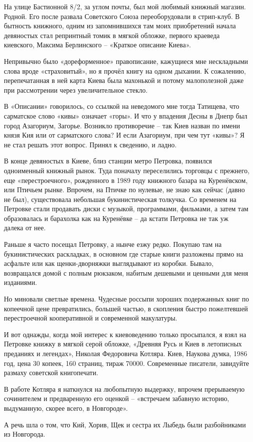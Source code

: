 На улице Бастионной 8/2, за углом почты, был мой любимый книжный магазин. Родной. Его после развала Советского Союза переоборудовали в стрип-клуб. В бытность книжного, одним из запомнившихся там моих приобретений начала девяностых стал репринтный томик в мягкой обложке, первого краеведа киевского, Максима Берлинского – «Краткое описание Киева».

Непривычно было «дореформенное» правописание, кажущиеся мне нескладными слова вроде «страховитый», но я прочёл книгу на одном дыхании. К сожалению, перепечатанная в ней карта Киева была махонькой и потому малополезной даже при рассмотрении через увеличительное стекло.

В «Описании» говорилось, со ссылкой на неведомого мне тогда Татищева, что сарматское слово «кивы» означает «горы». И что у впадения Десны в Днепр был город Азагориум, Загорье. Возникло противоречие – так Киев назван по имени князя Кия или от сарматского слова? И если Азагориум, при чем тут «кивы»? Я не стал решать этот вопрос. Принял к сведению, и ладно.

В конце девяностых в Киеве, близ станции метро Петровка, появился одноименный книжный рынок. Туда поначалу переселились торговцы с прежнего, еще «перестроечного», рожденного в 1989 году книжного базара на Куренёвском, или Птичьем рынке. Впрочем, на Птичке по нулевые, не знаю как сейчас (давно не был), существовала небольшая букинистическая толкучка. Со временем на Петровке стали продавать диски с музыкой, программами, фильмами, а затем там образовалась и барахолка как на Куренёвке – да кстати Петровка не так уж далека от нее.

Раньше я часто посещал Петровку, а нынче езжу редко. Покупаю там на букинистических раскладках, в основном где старые книги разложены прямо на асфальте или как щенки-дворняжки выглядывают из коробки. Бывало, возвращался домой с полным рюкзаком, набитым дешевыми и ценными для меня изданиями.

Но миновали светлые времена. Чудесные россыпи хороших подержанных книг по копеечной цене превратились, большей частью, в скопления быстро пожелтевшей перестроечной кооперативной и современной макулатуры.

И вот однажды, когда мой интерес к киевоведению только просыпался, я взял на Петровке книжку в мягкой серой обложке, «Древняя Русь и Киев в летописных преданиях и легендах», Николая Федоровича Котляра. Киев, Наукова думка, 1986 год, цена 30 копеек, 160 страниц, тираж 70000. Современные писатели, завидуйте размаху советской книгопечати.

В работе Котляра я наткнулся на любопытную выдержку, впрочем прерываемую сочинителем и предваренную его оценкой – «встречаем забавную историю, выдуманную, скорее всего, в Новгороде».

А речь шла о том, что Кий, Хорив, Щек и сестра их Лыбедь были разбойниками из Новгорода.
